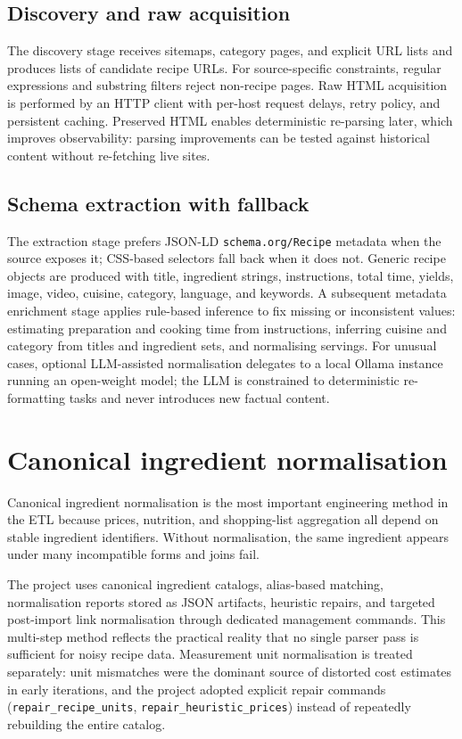 \subsection{Discovery and raw acquisition}

The discovery stage receives sitemaps, category pages, and explicit URL lists and produces lists of candidate recipe URLs. For source-specific constraints, regular expressions and substring filters reject non-recipe pages. Raw HTML acquisition is performed by an HTTP client with per-host request delays, retry policy, and persistent caching. Preserved HTML enables deterministic re-parsing later, which improves observability: parsing improvements can be tested against historical content without re-fetching live sites.

\subsection{Schema extraction with fallback}

The extraction stage prefers JSON-LD \texttt{schema.org/Recipe} metadata when the source exposes it; CSS-based selectors fall back when it does not. Generic recipe objects are produced with title, ingredient strings, instructions, total time, yields, image, video, cuisine, category, language, and keywords. A subsequent metadata enrichment stage applies rule-based inference to fix missing or inconsistent values: estimating preparation and cooking time from instructions, inferring cuisine and category from titles and ingredient sets, and normalising servings. For unusual cases, optional LLM-assisted normalisation delegates to a local Ollama instance running an open-weight model; the LLM is constrained to deterministic re-formatting tasks and never introduces new factual content.

\section{Canonical ingredient normalisation}

Canonical ingredient normalisation is the most important engineering method in the ETL because prices, nutrition, and shopping-list aggregation all depend on stable ingredient identifiers. Without normalisation, the same ingredient appears under many incompatible forms and joins fail.

The project uses canonical ingredient catalogs, alias-based matching, normalisation reports stored as JSON artifacts, heuristic repairs, and targeted post-import link normalisation through dedicated management commands. This multi-step method reflects the practical reality that no single parser pass is sufficient for noisy recipe data. Measurement unit normalisation is treated separately: unit mismatches were the dominant source of distorted cost estimates in early iterations, and the project adopted explicit repair commands (\texttt{repair\_recipe\_units}, \texttt{repair\_heuristic\_prices}) instead of repeatedly rebuilding the entire catalog.

